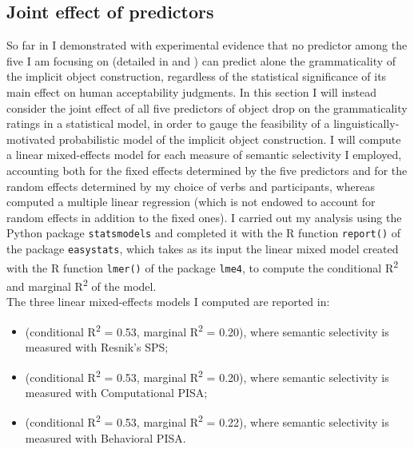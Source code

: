 \subsection{Joint effect of predictors}  

So far in  I demonstrated with experimental evidence that no predictor among the five I am focusing on (detailed in  and ) can predict alone the grammaticality of the implicit object construction, regardless of the statistical significance of its main effect on human acceptability judgments. In this section I will instead consider the joint effect of all five predictors of object drop on the grammaticality ratings in a statistical model, in order to gauge the feasibility of a linguistically-motivated probabilistic model of the implicit object construction. I will compute a linear mixed-effects model for each measure of semantic selectivity I employed, accounting both for the fixed effects determined by the five predictors and for the random effects determined by my choice of verbs and participants, whereas \textcite[131]{Medina2007} computed a multiple linear regression (which is not endowed to account for random effects in addition to the fixed ones). I carried out my analysis using the Python package \texttt{statsmodels} and completed it with the R function \texttt{report()} of the package \texttt{easystats}, which takes as its input the linear mixed model created with the R function \texttt{lmer()} of the package \texttt{lme4}, to compute the conditional R\textsuperscript{2} and marginal R\textsuperscript{2} of the model.\\
The three linear mixed-effects models I computed are reported in:
\begin{itemize}
    \item {} (conditional R\textsuperscript{2} = 0.53, marginal R\textsuperscript{2} = 0.20), where semantic selectivity is measured with Resnik's SPS;
    \item {} (conditional R\textsuperscript{2} = 0.53, marginal R\textsuperscript{2} = 0.20), where semantic selectivity is measured with Computational PISA;
    \item {} (conditional R\textsuperscript{2} = 0.53, marginal R\textsuperscript{2} = 0.22), where semantic selectivity is measured with Behavioral PISA.
\end{itemize}

